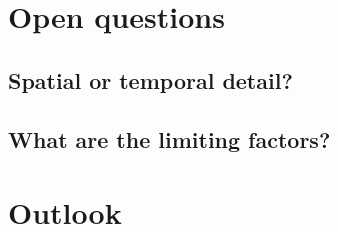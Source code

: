 \section{Open questions}
\subsection{Spatial or temporal detail?}

\subsection{What are the limiting factors?}

\section{Outlook}
